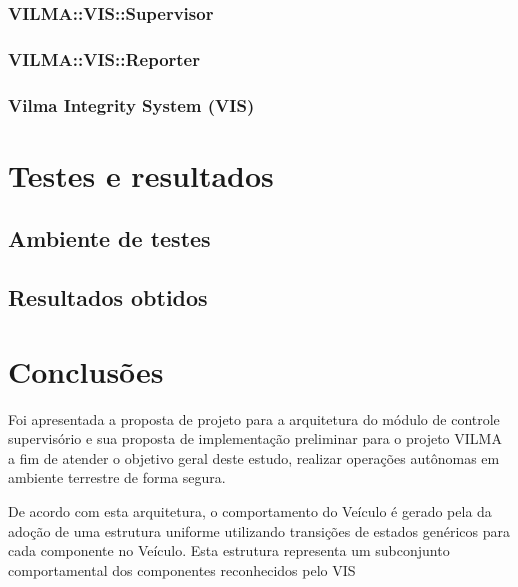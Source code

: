 \documentclass[conference]{IEEEtran}
\begin{document}
\subsubsection{VILMA::VIS::Supervisor}\label{subsubsec:supervisor}

\subsubsection{VILMA::VIS::Reporter}\label{subsubsec:reporter}

\subsubsection{Vilma Integrity System (VIS)}\label{subsubsec:vis}


\section{Testes e resultados}\label{sec:tests_results}

\subsection{Ambiente de testes}\label{subsubsec:tests_environment}

\subsection{Resultados obtidos}\label{subsubsec:results}


\section{Conclusões}\label{sec:conclusion}

Foi apresentada a proposta de projeto para a arquitetura do módulo de controle supervisório e sua proposta de implementação preliminar para o projeto VILMA a fim de atender o objetivo geral deste estudo, realizar operações autônomas em ambiente terrestre de forma segura.  

De acordo com esta arquitetura, o comportamento do Veículo é gerado pela da adoção de uma estrutura uniforme utilizando transições de estados genéricos para cada componente no Veículo. Esta estrutura representa um subconjunto comportamental dos componentes reconhecidos pelo VIS
\end{document}
